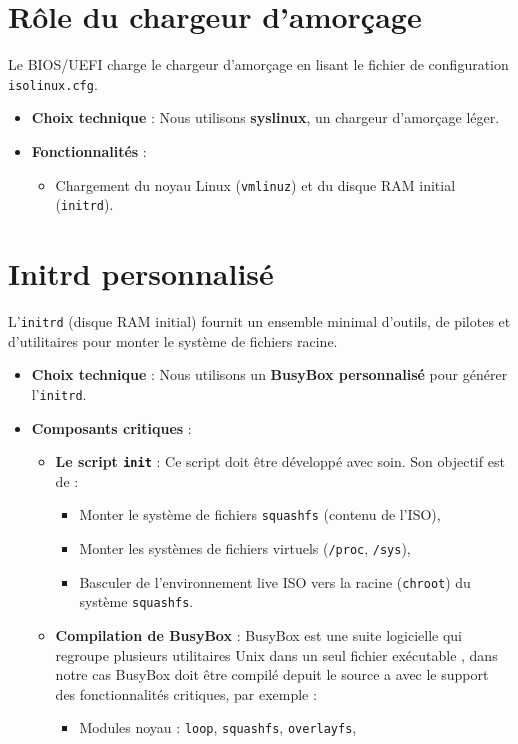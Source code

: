 \section{Rôle du chargeur d’amorçage}  
Le BIOS/UEFI charge le chargeur d’amorçage en lisant le fichier de configuration \texttt{isolinux.cfg}.  
\begin{itemize}  
  \item \textbf{Choix technique} : Nous utilisons \textbf{syslinux}, un chargeur d’amorçage léger.  
  \item \textbf{Fonctionnalités} :  
    \begin{itemize}  
      \item Chargement du noyau Linux (\texttt{vmlinuz}) et du disque RAM initial (\texttt{initrd}).  
      
    \end{itemize}  
\end{itemize}  

\section{Initrd personnalisé}  
L’\texttt{initrd} (disque RAM initial) fournit un ensemble minimal d’outils, de pilotes et d’utilitaires pour monter le système de fichiers racine.  
\begin{itemize}  
  \item \textbf{Choix technique} : Nous utilisons un \textbf{BusyBox personnalisé} pour générer l’\texttt{initrd}.  
  \item \textbf{Composants critiques} :  
    \begin{itemize}  
      \item \textbf{Le script \texttt{init}} :  
            Ce script doit être développé avec soin. Son objectif est de :  
            \begin{itemize}  
              \item Monter le système de fichiers \texttt{squashfs} (contenu de l’ISO),  
              \item Monter les systèmes de fichiers virtuels (\texttt{/proc}, \texttt{/sys}),  
              \item Basculer de l’environnement live ISO vers la racine (\texttt{chroot}) du système \texttt{squashfs}.  
            \end{itemize}  
      \item \textbf{Compilation de BusyBox} :  
            BusyBox est une suite logicielle qui regroupe plusieurs utilitaires Unix dans un seul fichier exécutable , dans notre cas BusyBox doit être compilé depuit le source a avec le support des fonctionnalités critiques, par exemple :  
            \begin{itemize}  
              \item Modules noyau : \texttt{loop}, \texttt{squashfs}, \texttt{overlayfs},  
                
            \end{itemize}  
    \end{itemize}  
\end{itemize}  

